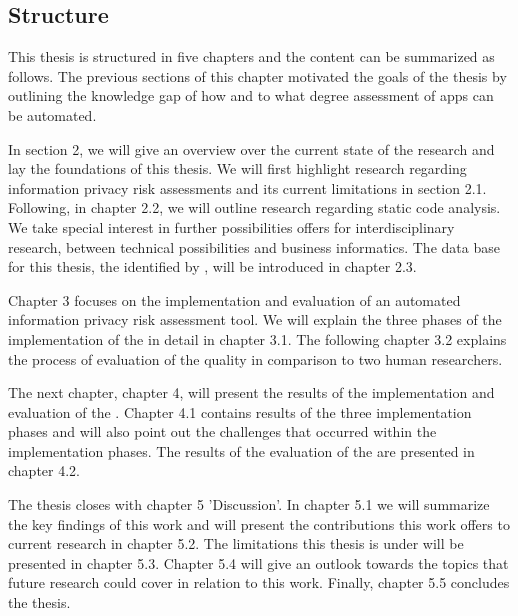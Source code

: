 \subsection{Structure}

This thesis is structured in five chapters and the content can be summarized as follows. 
The previous sections of this chapter motivated the goals of the thesis by outlining the knowledge gap of how and to what degree \ipr assessment of \mH apps can be automated.

In section 2, we will give an overview over the current state of the research and lay the foundations of this thesis.
We will first highlight research regarding information privacy risk assessments and its current limitations in section 2.1.
Following, in chapter 2.2, we will outline research regarding static code analysis. 
We take special interest in further possibilities \sca offers for interdisciplinary research, between technical possibilities and business informatics.
The data base for this thesis, the \ipp identified by \textcite{Dehling2016}, will be introduced in chapter 2.3.

Chapter 3 focuses on the implementation and evaluation of an automated information privacy risk assessment tool.
We will explain the three phases of the implementation of the \aiprat in detail in chapter 3.1.
The following chapter 3.2 explains the process of evaluation of the \aiprat quality in comparison to two human researchers.

The next chapter, chapter 4, will present the results of the implementation and evaluation of the \aiprat.
Chapter 4.1 contains results of the three implementation phases and will also point out the challenges that occurred within the implementation phases.
The results of the evaluation of the \aiprat are presented in chapter 4.2.

The thesis closes with chapter 5 'Discussion'. 
In chapter 5.1 we will summarize the key findings of this work and will present the contributions this work offers to current research in chapter 5.2.
The limitations this thesis is under will be presented in chapter 5.3.
Chapter 5.4 will give an outlook towards the topics that future research could cover in relation to this work.
Finally, chapter 5.5 concludes the thesis.
